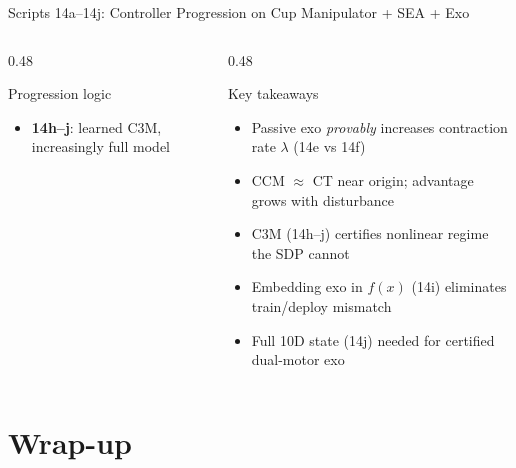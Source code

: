 \documentclass[10pt,aspectratio=169]{beamer}
\begin{document}
\begin{frame}{Scripts 14a–14j: Controller Progression on Cup Manipulator + SEA + Exo}
\begin{columns}[T,onlytextwidth]
\begin{column}{0.48\textwidth}
\begin{block}{Progression logic}
\begin{itemize}
    \item \textbf{14h–j}: learned C3M, increasingly full model
\end{itemize}
\end{block}
\end{column}
\begin{column}{0.48\textwidth}
\begin{block}{Key takeaways}
\begin{itemize}
    \item Passive exo \emph{provably} increases contraction rate $\lambda$ (14e vs 14f)
    \item CCM $\approx$ CT near origin; advantage grows with disturbance
    \item C3M (14h–j) certifies nonlinear regime the SDP cannot
    \item Embedding exo in $f(x)$ (14i) eliminates train/deploy mismatch
    \item Full 10D state (14j) needed for certified dual-motor exo
\end{itemize}
\end{block}
\end{column}
\end{columns}
\end{frame}

\section{Wrap-up}
\end{document}

